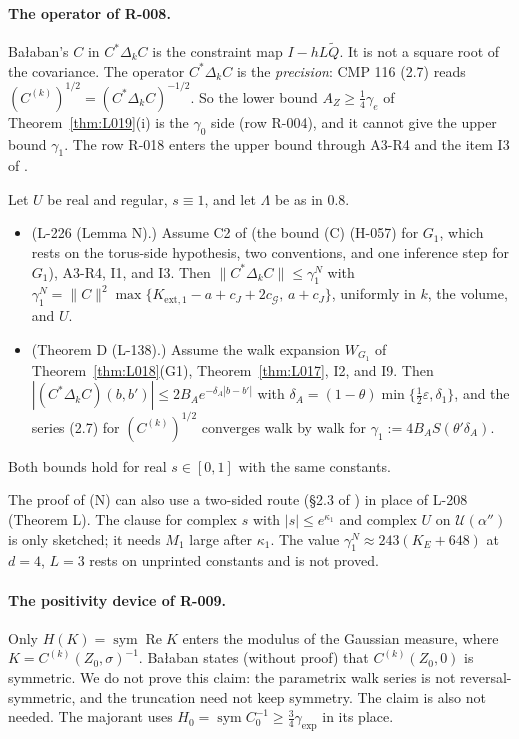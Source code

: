 \paragraph{The operator of R-008.} Ba{\l}aban's $C$ in $C^*\Delta_kC$ is the constraint map $I-hL\tilde Q$. It is not a square root of the covariance. The operator $C^*\Delta_kC$ is the \emph{precision}: CMP 116 (2.7) reads $(C^{(k)})^{1/2}=(C^*\Delta_kC)^{-1/2}$. So the lower bound $A_Z\ge\tfrac14\gamma_e$ of Theorem~\ref{thm:L019}(i) is the $\gamma_0$ side (row R-004), and it cannot give the upper bound $\gamma_1$. The row R-018 enters the upper bound through A3-R4 and the item I3 of .

\begin{theorem}\label{thm:L020}
Let $U$ be real and regular, $s\equiv1$, and let $\Lambda$ be as in  0.8.
\begin{itemize}
\item[(N)] (L-226 (Lemma N).) Assume C2 of  (the bound (C) (H-057) for $G_1$, which rests on the torus-side hypothesis, two conventions, and one inference step for $G_1$), A3-R4, I1, and I3. Then $\|C^*\Delta_kC\|\le\gamma_1^N$ with $\gamma_1^N=\|C\|^2\max\{K_{\mathrm{ext},1}-a+c_J+2c_{\mathcal G},\,a+c_J\}$, uniformly in $k$, the volume, and $U$.
\item[(D)] (Theorem D (L-138).) Assume the walk expansion $W_{G_1}$ of Theorem~\ref{thm:L018}(G1), Theorem~\ref{thm:L017}, I2, and I9. Then $|(C^*\Delta_kC)(b,b')|\le2B_Ae^{-\delta_A|b-b'|}$ with $\delta_A=(1-\theta)\min\{\tfrac12\varepsilon,\delta_1\}$, and the series (2.7) for $(C^{(k)})^{1/2}$ converges walk by walk for $\gamma_1:=4B_AS(\theta'\delta_A)$.
\end{itemize}
Both bounds hold for real $s\in[0,1]$ with the same constants.
\end{theorem}
The proof of (N) can also use a two-sided route (\S2.3 of ) in place of L-208 (Theorem L). The clause for complex $s$ with $|s|\le e^{\kappa_1}$ and complex $U$ on $\mathcal U(\alpha'')$ is only sketched; it needs $M_1$ large after $\kappa_1$. The value $\gamma_1^N\approx243(K_E+648)$ at $d=4$, $L=3$ rests on unprinted constants and is not proved.

\paragraph{The positivity device of R-009.} Only $H(K)=\operatorname{sym}\operatorname{Re}K$ enters the modulus of the Gaussian measure, where $K=C^{(k)}(Z_0,\sigma)^{-1}$. Ba{\l}aban states (without proof) that $C^{(k)}(Z_0,0)$ is symmetric. We do not prove this claim: the parametrix walk series is not reversal-symmetric, and the truncation need not keep symmetry. The claim is also not needed. The majorant uses $H_0=\operatorname{sym}C_0^{-1}\ge\tfrac34\gamma_{\exp}$ in its place.

